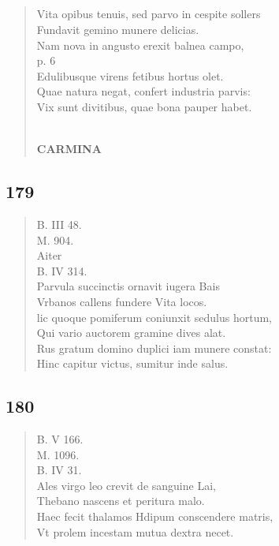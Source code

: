 \documentclass[11pt, a4paper]{report}
\begin{document}
            \subsection*{}
      \begin{verse}
      Vita opibus tenuis, sed parvo in cespite sollers \\ Fundavit gemino munere delicias. \\ Nam nova  \lbrack in \rbrack  angusto erexit balnea campo, \\ p. 6 \\ Edulibusque virens fetibus hortus olet. \\ Quae natura negat, confert industria parvis: \\ Vix sunt divitibus, quae bona pauper habet. \\ 
        ﻿\pagebreak 
     \marginpar{[154]} \begin{center} \textbf{CARMINA} \end{center}
      \end{verse}
  
            \subsection*{179}
      \begin{verse}
      B. III 48. \\ M. 904. \\ Aiter \\ B. IV 314. \\ Parvula succinctis ornavit iugera Bais \\ Vrbanos callens fundere Vita locos. \\ lic quoque pomiferum coniunxit sedulus hortum, \\ Qui vario auctorem gramine dives alat. \\ Rus gratum domino duplici iam munere constat: \\ Hinc capitur victus, sumitur inde salus. \\ 
      \end{verse}
  
            \subsection*{180}
      \begin{verse}
      B. V 166. \\ M. 1096. \\ B. IV 31. \\ Ales virgo leo crevit de sanguine Lai, \\ Thebano nascens et peritura malo. \\ Haec fecit thalamos Hdipum conscendere matris, \\ Vt prolem incestam mutua dextra necet. \\ 
      \end{verse}
  
\end{document}
